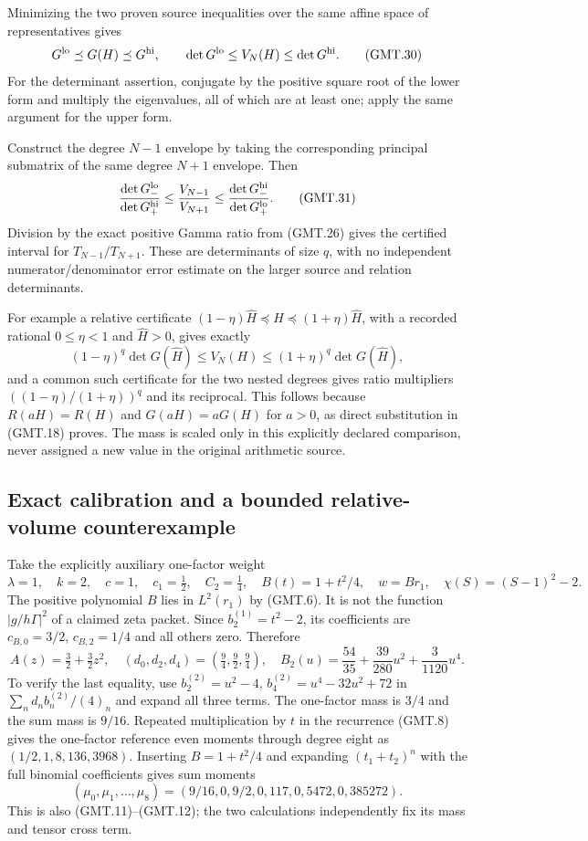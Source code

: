 Minimizing the two proven source inequalities over the same affine
space of representatives gives
\[
 G^{\rm lo}\preceq G(H)\preceq G^{\rm hi},\qquad
 \det G^{\rm lo}\le V_N(H)\le\det G^{\rm hi}.                  \tag{GMT.30}
\]
For the determinant assertion, conjugate by the positive square root
of the lower form and multiply the eigenvalues, all of which are at
least one; apply the same argument for the upper form.

Construct the degree $N-1$ envelope by taking the corresponding
principal submatrix of the same degree $N+1$ envelope. Then
\[
 \frac{\det G_-^{\rm lo}}{\det G_+^{\rm hi}}
 \le\frac{V_{N-1}}{V_{N+1}}
 \le\frac{\det G_-^{\rm hi}}{\det G_+^{\rm lo}}.               \tag{GMT.31}
\]
Division by the exact positive Gamma ratio from (GMT.26) gives the
certified interval for $T_{N-1}/T_{N+1}$. These are determinants
of size $q$, with no independent numerator/denominator error estimate
on the larger source and relation determinants.

For example a relative certificate
$(1-\eta)\widehat H\preceq H\preceq(1+\eta)\widehat H$,
with a recorded rational $0\le\eta<1$ and $\widehat H>0$,
gives exactly
\[
 (1-\eta)^q\det G(\widehat H)\le V_N(H)
       \le(1+\eta)^q\det G(\widehat H),
\]
and a common such certificate for the two nested degrees gives ratio
multipliers $((1-\eta)/(1+\eta))^q$ and its reciprocal.
This follows because $R(aH)=R(H)$ and $G(aH)=aG(H)$ for $a>0$,
as direct substitution in (GMT.18) proves. The mass is scaled only
in this explicitly declared comparison, never assigned a new value
in the original arithmetic source.

\subsection{Exact calibration and a bounded relative-volume counterexample}

Take the explicitly auxiliary one-factor weight
\[
 \lambda=1,\quad k=2,\quad c=1,\quad
 c_1=\tfrac12,\quad C_2=\tfrac14,\quad
 B(t)=1+t^2/4,\quad w=B r_1,\quad
 \chi(S)=(S-1)^2-2.                                           \tag{GMT.32}
\]
The positive polynomial $B$ lies in $L^2(r_1)$ by (GMT.6).
It is not the function $|g/h\Gamma|^2$ of a claimed zeta packet.
Since $b_2^{(1)}=t^2-2$, its coefficients are
$c_{B,0}=3/2$, $c_{B,2}=1/4$ and all others zero. Therefore
\[
 A(z)=\tfrac32+\tfrac32z^2,\quad
 (d_0,d_2,d_4)=(\tfrac94,\tfrac92,\tfrac94),\quad
 B_2(u)=\frac{54}{35}+\frac{39}{280}u^2+\frac{3}{1120}u^4.
                                                                    \tag{GMT.33}
\]
To verify the last equality, use
$b_2^{(2)}=u^2-4$,
$b_4^{(2)}=u^4-32u^2+72$ in
$\sum_n d_nb_n^{(2)}/(4)_n$ and expand all three terms.
The one-factor mass is $3/4$ and the sum mass is $9/16$.
Repeated multiplication by $t$ in the recurrence (GMT.8) gives
the one-factor reference even moments through degree eight as
$(1/2,1,8,136,3968)$. Inserting $B=1+t^2/4$ and expanding
$(t_1+t_2)^n$ with the full binomial coefficients gives sum moments
\[
 (\mu_0,\mu_1,\ldots,\mu_8)
 =(9/16,0,9/2,0,117,0,5472,0,385272).                          \tag{GMT.34}
\]
This is also (GMT.11)--(GMT.12); the two calculations independently
fix its mass and tensor cross term.

